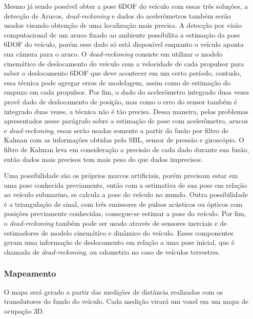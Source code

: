 Mesmo já sendo possível obter a pose 6DOF do veículo com essas três soluções, a detecção de Arucos, \textit{dead-reckoning} e dados do acelerômetros também serão usados visando obtenção de uma localização mais precisa. A detecção por visão computacional de um aruco fixado ao ambiente possibilita a estimação da pose 6DOF do veículo, porém esse dado só está disponível enquanto o veículo aponta sua câmera para o aruco. O \textit{dead-reckoning} consiste em utilizar o modelo cinemático de deslocamento do veículo com a velocidade de cada propulsor para saber o deslocamento 6DOF que deve acontecer em um certo período, contudo, essa técnica pode agregar erros de modelagem, assim como de estimação do empuxo em cada propulsor. Por fim, o dado do acelerômetro integrado duas vezes provê dado de deslocamento de posição, mas como o erro do sensor também é integrado duas vezes, a técnica não é tão precisa. Dessa maneira, pelos problemas apresentados nesse parágrafo sobre a estimação de pose com acelerômetro, arucos e \textit{dead-reckoning}, essas serão usadas somente a partir da fusão por filtro de Kalman com as informações obtidas pelo SBL, sensor de pressão e giroscópio. O filtro de Kalman leva em consideração a precisão de cada dado durante sua fusão, então dados mais precisos tem mais peso do que dados imprecisos. 

Uma possibilidade são os próprios marcos artificiais, porém precisam estar em uma pose conhecida previamente, então com a estimativa de sua pose em relação ao veículo submarino, se calcula a pose do veículo no mundo. Outra possibilidade é a triangulação de sinal, com três emissores de pulsos acústicos ou ópticos com posições previamente conhecidas, consegue-se estimar a pose do veículo. Por fim, o \textit{dead-reckoning} também pode ser usado através de sensores inerciais e de estimadores de modelo cinemático e dinâmico do veículo. Esses componentes geram uma informação de deslocamento em relação a uma pose inicial, que é chamada de \textit{dead-reckoning}, ou odometria no caso de veículos terrestres.

\subsubsection*{Mapeamento}
\label{subsubsec:mapeamento}

O mapa será gerado a partir das medições de distância realizadas com os transdutores do fundo do veículo. Cada medição virará um voxel em um mapa de ocupação 3D.